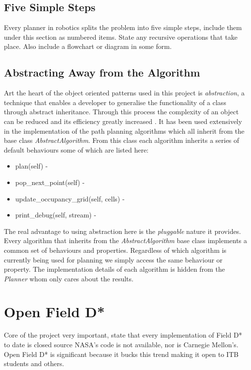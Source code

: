 \subsection{Five Simple Steps}
Every planner in robotics splits the problem into five simple steps, include them under this section as numbered items. State any recursive operations that take place. Also include a flowchart or diagram in some form.

\subsection{Abstracting Away from the Algorithm}
\noindent
Art the heart of the object oriented patterns used in this project is \textit{abstraction}, a technique that enables a developer to generalise the functionality of a class through abstract inheritance. Through this process the complexity of an object can be reduced and its efficiency greatly increased \cite{http://whatis.techtarget.com/definition/abstraction}. It has been used extensively in the implementation of the path planning algorithms which all inherit from the base class \textit{AbstractAlgorithm}. From this class each algorithm inherits a series of default behaviours some of which are listed here:

\begin{itemize}
\item plan(self) -
\item pop\_next\_point(self) -
\item update\_occupancy\_grid(self, cells) - 
\item print\_debug(self, stream) - 
\end{itemize}

\noindent
The real advantage to using abstraction here is the \textit{pluggable} nature it provides. Every algorithm that inherits from the \textit{AbstractAlgorithm} base class implements a common set of behaviours and properties. Regardless of which algorithm is currently being used for planning we simply access the same behaviour or property. The implementation details of each algorithm is hidden from the \textit{Planner} whom only cares about the results.


\newpage

\section{Open Field D*}
Core of the project very important, state that every implementation of Field D* to date is closed source NASA's code is not available, nor is Carnegie Mellon's. Open Field D* is significant because it bucks this trend making it open to ITB students and others.

